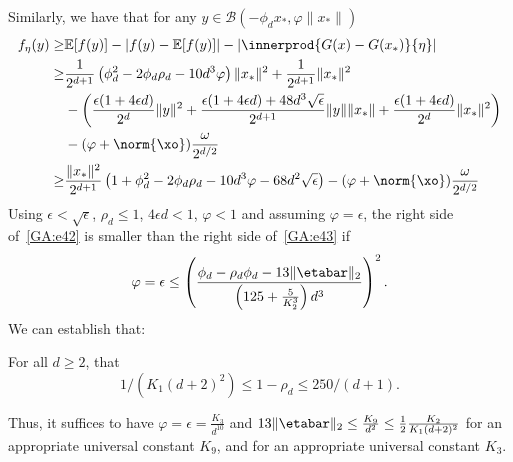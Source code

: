 Similarly, we have that for any $y \in \mathcal{B}(- \phi_d x_*, \varphi  \|x_*\|)$
\begin{align}
f_\eta(y) \geq& \mathbb{E}[f(y)] - |f(y) - \mathbb{E}[f(y)]| 
- 
\left|\innerprod{G(x) - G(x_\ast)}{\eta}\right|
  \nonumber \\
\geq& \frac{1}{2^{d+1}} \left(\phi_d^2 - 2 \phi_d \rho_d - 10 d^3 \varphi \right) \|x_*\|^2 + \frac{1}{2^{d+1}} \|x_*\|^2 \nonumber \\
&- \left( \frac{\epsilon (1 + 4 \epsilon d)}{2^d} \|y\|^2 + \frac{\epsilon(1 + 4 \epsilon d) + 48 d^3 \sqrt{\epsilon}}{2^{d+1}} \|y\| \|x_*\| + \frac{\epsilon (1 + 4 \epsilon d)}{2^d} \|x_*\|^2 \right) \nonumber \\
&- (\varphi + \norm{\xo}) \frac{\omega}{2^{d/2}} \nonumber \\
\geq& 
\frac{\|x_*\|^2}{2^{d+1}} \left(1 + \phi_d^2 - 2 \phi_d \rho_d - 10 d^3 \varphi 
- 68 d^2 \sqrt{\epsilon}
\right) -(\varphi + \norm{\xo}) \frac{\omega}{2^{d/2}}
\label{GA:e43}
\end{align}
Using $\epsilon < \sqrt{\epsilon}$, $\rho_d \leq 1$, $4 \epsilon d < 1$, $\varphi < 1$ and assuming $\varphi = \epsilon$, the right side of~\eqref{GA:e42} is smaller than the right side of~\eqref{GA:e43} if
\begin{equation} \label{GA:e44}
\varphi = \epsilon \leq \left(\frac{\phi_d - \rho_d \phi_d  - 13 \|\etabar\|_2}{\left( 125 + \frac{5}{K_2^3} \right) d^3} \right)^2.
\end{equation}
We can establish that:
\begin{lemma}\label{lemma:rho-d}
For all $d\geq 2$, that
\[
1/\left(K_1(d + 2)^2\right) \leq 1 - \rho_d \leq 250/(d + 1).
\]
\end{lemma}
Thus, it suffices to have $\varphi = \epsilon = \frac{K_3}{d^{10}}$ and $13 \|\etabar\|_2 \leq \frac{K_9}{d^2} \leq \frac{1}{2} \frac{K_2}{K_1 (d+2)^2}$ for an appropriate universal constant $K_9$, and for an appropriate universal constant $K_3$.  %

